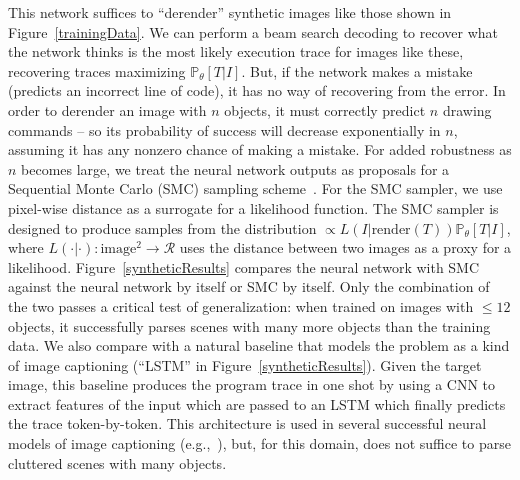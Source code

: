 \documentclass{article}
\newcommand{\probability}{\mathds{P}} %
\begin{document}
This network suffices to ``derender'' synthetic images like those shown in
Figure~\ref{trainingData}.  We can perform a beam search decoding to
recover what the network thinks is the most likely execution trace for
images like these, recovering traces maximizing $\probability_\theta
[T|I]$. But, if the network makes a mistake (predicts an incorrect
line of code), it has no way of recovering from the error.  In order
to derender an image with $n$ objects, it must correctly predict $n$
drawing commands -- so its probability of success will decrease
exponentially in $n$, assuming it has any nonzero chance of making a
mistake.  For added robustness as $n$ becomes large, we treat the
neural network outputs as proposals for a Sequential Monte Carlo (SMC) sampling scheme~\cite{SMCBook}.  For
the SMC sampler, we use pixel-wise distance as a surrogate for a
likelihood function. The SMC sampler is designed to produce samples
from the distribution $\propto L(I|\text{render}(T))
\probability_\theta[T|I]$, where $L(\cdot | \cdot):\text{image}^2\to
\mathcal{R}$ uses the distance between two images as a proxy for a
likelihood.
%
Figure~\ref{syntheticResults}
compares the neural network with SMC against the neural network by
itself or SMC by itself.  Only the combination of the two passes a
critical test of generalization: when trained on images with $\leq 12$
objects, it successfully parses scenes with many more objects than the
training data.
We also compare with a natural baseline that models the problem as a kind of image captioning (``LSTM'' in Figure~\ref{syntheticResults}).
Given the target image, this baseline produces the program trace in one shot by
using a CNN to extract features of the input which are passed to an LSTM which finally predicts
the trace token-by-token.
This architecture is used in several successful neural models of image captioning (e.g.,~\cite{vinyals2015show}),
but, for this domain, does not suffice to parse cluttered scenes with many objects.
\end{document}
